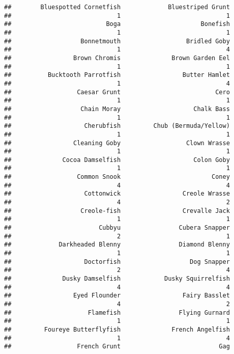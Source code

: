 \documentclass[
]{article}
\begin{document}
\begin{verbatim}
##        Bluespotted Cornetfish             Bluestriped Grunt 
##                             1                             1 
##                          Boga                      Bonefish 
##                             1                             1 
##                   Bonnetmouth                  Bridled Goby 
##                             1                             4 
##                 Brown Chromis              Brown Garden Eel 
##                             1                             1 
##          Bucktooth Parrotfish                 Butter Hamlet 
##                             1                             4 
##                  Caesar Grunt                          Cero 
##                             1                             1 
##                   Chain Moray                    Chalk Bass 
##                             1                             1 
##                    Cherubfish         Chub (Bermuda/Yellow) 
##                             1                             1 
##                 Cleaning Goby                  Clown Wrasse 
##                             1                             1 
##              Cocoa Damselfish                    Colon Goby 
##                             1                             1 
##                  Common Snook                         Coney 
##                             4                             4 
##                    Cottonwick                 Creole Wrasse 
##                             4                             2 
##                   Creole-fish                 Crevalle Jack 
##                             1                             1 
##                        Cubbyu                Cubera Snapper 
##                             2                             1 
##             Darkheaded Blenny                Diamond Blenny 
##                             1                             1 
##                    Doctorfish                   Dog Snapper 
##                             2                             4 
##              Dusky Damselfish            Dusky Squirrelfish 
##                             4                             4 
##                 Eyed Flounder                 Fairy Basslet 
##                             4                             2 
##                     Flamefish                Flying Gurnard 
##                             1                             1 
##         Foureye Butterflyfish              French Angelfish 
##                             1                             4 
##                  French Grunt                           Gag 

\end{verbatim}
\end{document}
